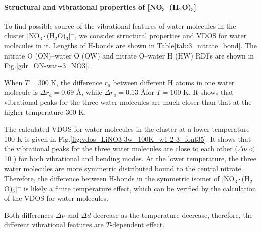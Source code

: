 \paragraph{Structural and vibrational properties of [NO$_3\cdot$(H$_2$O)$_3$]$^-$}
To find possible source of the vibrational features of water molecules in the 
cluster [NO$_3\cdot$(H$_2$O)$_3$]$^-$, we consider structural properties and VDOS for water molecules 
in it. 
Lengths of H-bonds are shown in Table\thinspace\ref{tab:3_nitrate_bond}. 
The nitrate O (ON)--water O (OW) 
and nitrate O--water H (HW) RDFs are shown in Fig.\thinspace\ref{gdr_ON-wat--3_NO3}.

%
When $T=300$ K, the difference $r_a$ between different H atoms in one water molecule is
$\Delta{r_a}=0.69$ \AA, while $\Delta{r_a}=0.13$ \AA for $T=100$ K. It shows that vibrational 
peaks for the three water molecules are much closer than that at the higher temperature 300 K. 

%
The calculated VDOS for water molecules in the cluster at a lower temperature 100 K is given in 
Fig.\thinspace\ref{fig:vdos_LiNO3-3w_100K_w1-2-3_font35}. 
It shows that the vibrational peaks for the three water molecules 
are close to each other ($\Delta\nu <$ 10 \cm) for both vibrational and bending modes.
At the lower temperature, the three water molecules 
are more symmetric distributed bound to the central nitrate. Therefore, the difference between H-bonds in the 
symmetric isomer of [NO$_3\cdot$(H$_2$O)$_3$]$^-$ is likely a finite temperature effect,
which can be verified by the calculation of the VDOS for water molecules.

%
Both differences $\Delta\nu$ and $\Delta{d}$ decrease as the temperature decrease,
therefore, the different vibrational features are $T$-dependent effect. 


